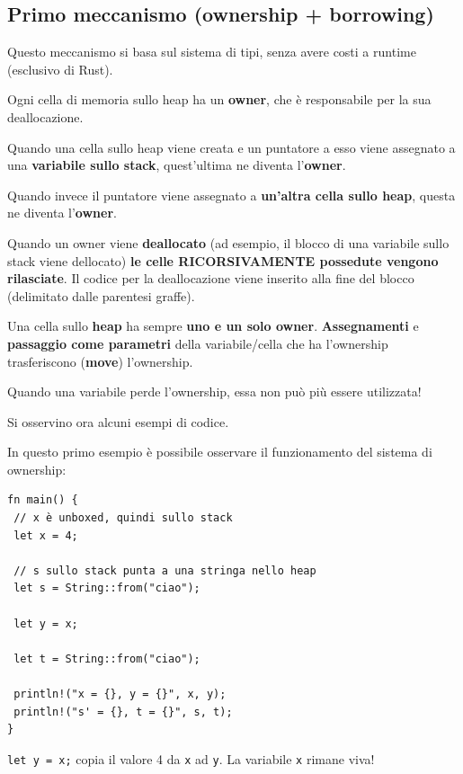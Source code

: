 \documentclass{article}
\begin{document}
\subsection*{Primo meccanismo (ownership + borrowing)}
Questo meccanismo si basa sul sistema di tipi, senza avere costi a runtime (esclusivo di Rust).

Ogni cella di memoria sullo heap ha un \textbf{owner}, che è responsabile per la sua deallocazione.

Quando una cella sullo heap viene creata e un puntatore a esso viene assegnato a una \textbf{variabile sullo stack}, quest’ultima ne diventa l’\textbf{owner}.

Quando invece il puntatore viene assegnato a \textbf{un’altra cella sullo heap}, questa ne diventa l’\textbf{owner}.

Quando un owner viene \textbf{deallocato} (ad esempio, il blocco di una variabile sullo stack viene dellocato) \textbf{le celle RICORSIVAMENTE possedute vengono rilasciate}. Il codice per la deallocazione viene inserito alla fine del blocco (delimitato dalle parentesi graffe).

Una cella sullo \textbf{heap} ha sempre \textbf{uno e un solo owner}. \textbf{Assegnamenti} e \textbf{passaggio come parametri} della variabile/cella che ha l’ownership trasferiscono (\textbf{move}) l’ownership.

Quando una variabile perde l’ownership, essa non può più essere utilizzata!

Si osservino ora alcuni esempi di codice.

In questo primo esempio è possibile osservare il funzionamento del sistema di ownership:
\begin{tcolorbox}
\begin{verbatim}
fn main() {
 // x è unboxed, quindi sullo stack
 let x = 4; 

 // s sullo stack punta a una stringa nello heap
 let s = String::from("ciao"); 

 let y = x;

 let t = String::from("ciao");

 println!("x = {}, y = {}", x, y);
 println!("s' = {}, t = {}", s, t);
}
\end{verbatim}
\end{tcolorbox}
\texttt{let y = x;} copia il valore 4 da \texttt{x} ad \texttt{y}. La variabile \texttt{x} rimane viva!
\end{document}
